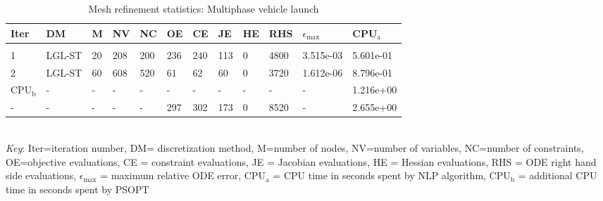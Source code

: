 
\begin{table}
\caption{Mesh refinement statistics: Multiphase vehicle launch}
\label{mesh_stats_launch}
\renewcommand{\tabcolsep}{0.15cm}
\tiny
\begin{tabular}{llllllllllll}
Iter&DM&M&NV&NC&OE&CE&JE&HE&RHS&$\epsilon_{\max}$&CPU$_\mathrm{a}$ \\ \hline \\
1&LGL-ST&20&208&200&236&240&113&0&4800&3.515e-03&5.601e-01\\
2&LGL-ST&60&608&520&61&62&60&0&3720&1.612e-06&8.796e-01\\
\hline
CPU$_\mathrm{b}$ &-&-&-&-&-&-&-&-&-&-&1.216e+00\\
-&-&-&-&-&297&302&173&0&8520&-&2.655e+00\\
\end{tabular}
\newline \\ \emph{Key}: Iter=iteration number, DM= discretization method, M=number of nodes, NV=number of variables, NC=number of constraints, OE=objective evaluations,  	              CE = constraint evaluations, JE = Jacobian evaluations, HE = Hessian evaluations, RHS = ODE right hand side 		      evaluations, $\epsilon_{\max}$ = maximum relative ODE error, CPU$_\mathrm{a}$ = CPU time in seconds spent by NLP algorithm, 		      CPU$_\mathrm{b}$ = additional CPU time in seconds spent by PSOPT
\normalsize
\end{table}